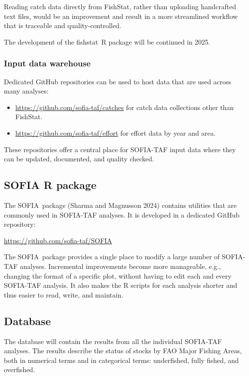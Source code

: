 \documentclass[12pt]{article}
\newcommand\blue[1]{\textcolor{darkblue}{#1}}
\newcommand\fishstat{{\sf fishstat}}
\newcommand\SOFIA{{\sf SOFIA}}
\begin{document}
Reading catch data directly from FishStat, rather than uploading handcrafted
text files, would be an improvement and result in a more streamlined workflow
that is traceable and quality-controlled.

The development of the \fishstat\ R package will be continued in 2025.

\subsubsection{Input data warehouse}
\label{subsubsec:design-data-warehouse}

Dedicated GitHub repositories can be used to host data that are used across many
analyses:

\begin{itemize}
  \item \blue{\url{https://github.com/sofia-taf/catches}} for catch data
  collections other than FishStat.
  \item \blue{\url{https://github.com/sofia-taf/effort}} for effort data by year
  and area.
\end{itemize}

These repositories offer a central place for SOFIA-TAF input data where they can
be updated, documented, and quality checked.

\subsection{SOFIA R package}

The \SOFIA\ package (Sharma and Magnusson 2024) contains utilities that are
commonly used in SOFIA-TAF analyses. It is developed in a dedicated GitHub
repository:

\qquad\blue{\url{https://github.com/sofia-taf/SOFIA}}

The \SOFIA\ package provides a single place to modify a large number of
SOFIA-TAF analyses. Incremental improvements become more manageable, e.g.,
changing the format of a specific plot, without having to edit each and every
SOFIA-TAF analysis. It also makes the R scripts for each analysis shorter and
thus easier to read, write, and maintain.

\subsection{Database}

The database will contain the results from all the individual SOFIA-TAF
analyses. The results describe the status of stocks by FAO Major Fishing Areas,
both in numerical terms and in categorical terms: underfished, fully fished, and
overfished.
\end{document}
